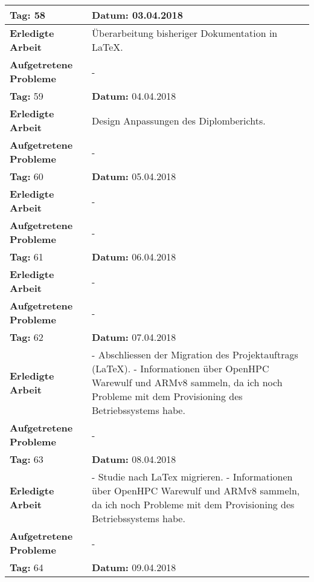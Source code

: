 \begin{longtable}{|p{5cm}|p{5cm}p{6cm}|}
\rowcolor{heading}\textbf{Tag:} 58 & \textbf{Datum:} 03.04.2018 & \\ \hline
\textbf{Erledigte Arbeit} & \multicolumn{2}{p{11cm}|}{Überarbeitung bisheriger Dokumentation in LaTeX.} \\ \hline
\textbf{Aufgetretene Probleme} & \multicolumn{2}{p{11cm}|}{-} \\ \hline
\rowcolor{heading}\textbf{Tag:} 59 & \textbf{Datum:} 04.04.2018 & \\ \hline
\textbf{Erledigte Arbeit} & \multicolumn{2}{p{11cm}|}{Design Anpassungen des Diplomberichts.} \\ \hline
\textbf{Aufgetretene Probleme} & \multicolumn{2}{p{11cm}|}{-} \\ \hline
\rowcolor{heading}\textbf{Tag:} 60 & \textbf{Datum:} 05.04.2018 & \\ \hline
\textbf{Erledigte Arbeit} & \multicolumn{2}{p{11cm}|}{-} \\ \hline
\textbf{Aufgetretene Probleme} & \multicolumn{2}{p{11cm}|}{-} \\ \hline
\rowcolor{heading}\textbf{Tag:} 61 & \textbf{Datum:} 06.04.2018 & \\ \hline
\textbf{Erledigte Arbeit} & \multicolumn{2}{p{11cm}|}{-} \\ \hline
\textbf{Aufgetretene Probleme} & \multicolumn{2}{p{11cm}|}{-} \\ \hline
\rowcolor{heading}\textbf{Tag:} 62 & \textbf{Datum:} 07.04.2018 & \\ \hline
\textbf{Erledigte Arbeit} & \multicolumn{2}{p{11cm}|}{- Abschliessen der Migration des Projektauftrags (LaTeX). \newline - Informationen über OpenHPC Warewulf und ARMv8 sammeln, da ich noch Probleme mit dem Provisioning des Betriebssystems habe.} \\ \hline
\textbf{Aufgetretene Probleme} & \multicolumn{2}{p{11cm}|}{-} \\ \hline
\rowcolor{heading}\textbf{Tag:} 63 & \textbf{Datum:} 08.04.2018 & \\ \hline
\textbf{Erledigte Arbeit} & \multicolumn{2}{p{11cm}|}{- Studie nach LaTex migrieren. \newline
- Informationen über OpenHPC Warewulf und ARMv8 sammeln, da ich noch Probleme mit dem Provisioning des Betriebssystems habe.} \\ \hline
\textbf{Aufgetretene Probleme} & \multicolumn{2}{p{11cm}|}{-} \\ \hline
\rowcolor{heading}\textbf{Tag:} 64 & \textbf{Datum:} 09.04.2018 & \\ \hline

\end{longtable}

